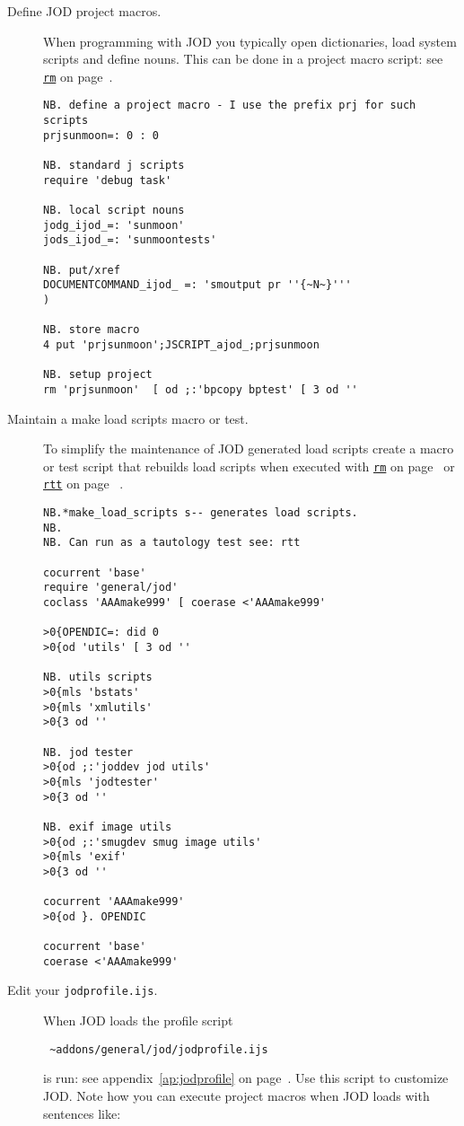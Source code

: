 \begin{description}
\item[Define JOD project macros.]  When programming with JOD you typically 
open dictionaries, load system scripts and define nouns. This can be done in 
a project macro script: see \hyperlink{il:rm}{\texttt{rm}} on page~\pageref{ss:rm}.

\begin{lstlisting}[frame=single,framerule=0pt]
NB. define a project macro - I use the prefix prj for such scripts
prjsunmoon=: 0 : 0

NB. standard j scripts
require 'debug task'

NB. local script nouns 
jodg_ijod_=: 'sunmoon'
jods_ijod_=: 'sunmoontests'

NB. put/xref
DOCUMENTCOMMAND_ijod_ =: 'smoutput pr ''{~N~}'''
)
   
NB. store macro
4 put 'prjsunmoon';JSCRIPT_ajod_;prjsunmoon

NB. setup project
rm 'prjsunmoon'  [ od ;:'bpcopy bptest' [ 3 od ''
\end{lstlisting}
 
 
\item[Maintain a make load scripts macro or test.] To simplify the maintenance of JOD generated load scripts
create a macro or test script that rebuilds load scripts when executed with \hyperlink{il:rm}{\texttt{rm}} on 
page~\pageref{ss:rm} or \hyperlink{il:rtt}{\texttt{rtt}} on page~\pageref{ss:rtt} . 

\begin{lstlisting}[frame=single,framerule=0pt]
NB.*make_load_scripts s-- generates load scripts.
NB.
NB. Can run as a tautology test see: rtt 

cocurrent 'base'
require 'general/jod'
coclass 'AAAmake999' [ coerase <'AAAmake999'

>0{OPENDIC=: did 0
>0{od 'utils' [ 3 od ''  

NB. utils scripts
>0{mls 'bstats'
>0{mls 'xmlutils'
>0{3 od ''

NB. jod tester 
>0{od ;:'joddev jod utils'
>0{mls 'jodtester'
>0{3 od ''

NB. exif image utils 
>0{od ;:'smugdev smug image utils'
>0{mls 'exif'
>0{3 od ''

cocurrent 'AAAmake999'
>0{od }. OPENDIC

cocurrent 'base'
coerase <'AAAmake999'
\end{lstlisting}

 
\item[Edit your \texttt{jodprofile.ijs}.]  When JOD loads the profile script
\begin{verbatim}
 ~addons/general/jod/jodprofile.ijs
\end{verbatim}
is run: see appendix~\ref{ap:jodprofile} on page~\pageref{ap:jodprofile}.  Use this 
script to customize JOD. Note how you can execute project macros when JOD loads with sentences like:


\end{description}
